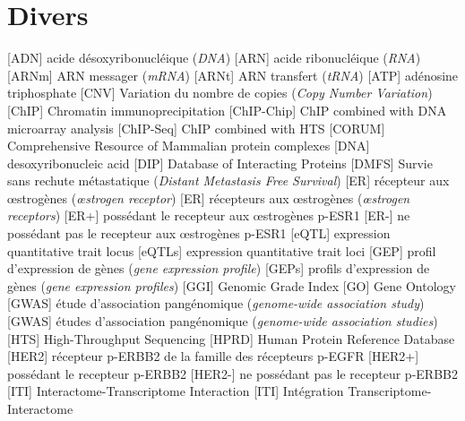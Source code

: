 	\section{\textcolor{white!15!black}{Divers}}
		\begin{acronym}[CDKN2A]
						[ADN]		{acide désoxyribonucléique (\emph{\acs{DNA}})}
						[ARN]		{acide ribonucléique (\emph{\acs{RNA}})}
						[ARNm]		{\acs{ARN} messager (\emph{\acs{mRNA}})}
						[ARNt]		{\acs{ARN} transfert (\emph{\acs{tRNA}})}
						[ATP]		{adénosine triphosphate}
						[CNV]		{Variation du nombre de copies (\emph{Copy Number Variation})}
						[ChIP]		{Chromatin immunoprecipitation}
				{\acs{ChIP} combined with DNA microarray analysis}
					[ChIP-Seq]	{\acs{ChIP} combined with \acs{HTS}}
						[CORUM]		{Comprehensive Resource of Mammalian protein complexes}
						[DNA]		{desoxyribonucleic acid}
						[DIP]		{Database of Interacting Proteins}
						[DMFS]		{Survie sans rechute métastatique (\emph{Distant Metastasis Free Survival})}
						[ER]		{récepteur aux {\oe}strogènes (\emph{{\oe}strogen receptor})}
					{récepteurs aux {\oe}strogènes (\emph{{\oe}strogen receptors})}
						[ER+]		{possédant le recepteur aux {\oe}strogènes \acs{p-ESR1}}
						[ER-]		{ne possédant pas le recepteur aux {\oe}strogènes \acs{p-ESR1}}
						[eQTL]		{expression quantitative trait locus}
						[eQTLs]		{expression quantitative trait loci}
						[GEP]		{profil d'expression de gènes (\emph{gene expression profile})}
					{profils d'expression de gènes (\emph{gene expression profiles})}
						[GGI]		{Genomic Grade Index}
						[GO]		{Gene Ontology}
						[GWAS]		{étude d'association pangénomique (\emph{genome-wide association study})}
					{études d'association pangénomique (\emph{genome-wide association studies})}
						[HTS]		{High-Throughput Sequencing}
						[HPRD]		{Human Protein Reference Database}
						[HER2]		{récepteur \acs{p-ERBB2} de la famille des récepteurs \acs{p-EGFR}}
						[HER2+]		{possédant le recepteur \acs{p-ERBB2}}
						[HER2-]		{ne possédant pas le recepteur \acs{p-ERBB2}}
						[ITI]		{Interactome-Transcriptome Interaction}
						[ITI]		{Intégration Transcriptome-Interactome}

\end{acronym}
